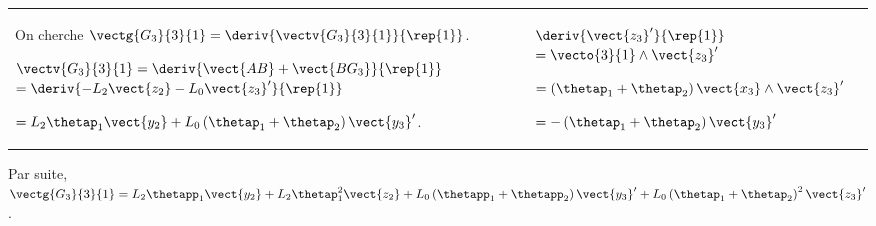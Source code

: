 \ifprof
\begin{corrige}
\begin{tabular}{p{.66\linewidth}| p{.3\linewidth}}
On cherche $\vectg{G_3}{3}{1} = \deriv{\vectv{G_3}{3}{1}}{\rep{1}}$.

$\vectv{G_3}{3}{1} = \deriv{\vect{AB}+\vect{BG_3}}{\rep{1}}$
$= \deriv{-L_2 \vect{z_2} -L_0 \vect{z_3}'}{\rep{1}}$

$=L_2 \thetap_1\vect{y_2}  +L_0  \left(\thetap_1 + \thetap_2 \right)\vect{y_3}'$.
&
$\deriv{\vect{z_3}'}{\rep{1}} $ $=\vecto{3}{1}\wedge \vect{z_3}' $

$= \left(\thetap_1 + \thetap_2 \right)\vect{x_3} \wedge \vect{z_3}' $

$= - \left(\thetap_1 + \thetap_2 \right)\vect{y_3}' $ 
\\
\end{tabular}

Par suite, 
$\vectg{G_3}{3}{1} = L_2 \thetapp_1\vect{y_2}  +L_2 \thetap_1^2\vect{z_2}  + L_0  \left(\thetapp_1 + \thetapp_2 \right)\vect{y_3}'+ L_0  \left(\thetap_1 + \thetap_2 \right)^2\vect{z_3}'$.


\end{corrige}
\else
\fi

